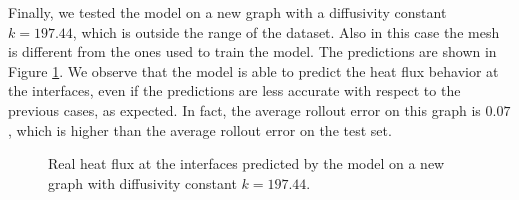 \documentclass[11pt,a4paper]{article}
\begin{document}
Finally, we tested  the model on a new graph with a diffusivity constant \(k=197.44\), which is outside the range of the dataset. Also in this case the mesh is different from the ones used to train the model.
The predictions are shown in Figure \ref{new3}. We observe that the model is able to predict the heat flux behavior at the interfaces, even if the predictions are less accurate with respect to the previous cases, as expected. In fact, the average rollout error on this graph is \(0.07\), which is higher than the average rollout error on the test set. 

\begin{figure}[H]
    \centering
    \caption{Real heat flux at the interfaces predicted by the model on a new graph with diffusivity constant \(k=197.44\).}
    \label{new3}
\end{figure}

\end{document}
